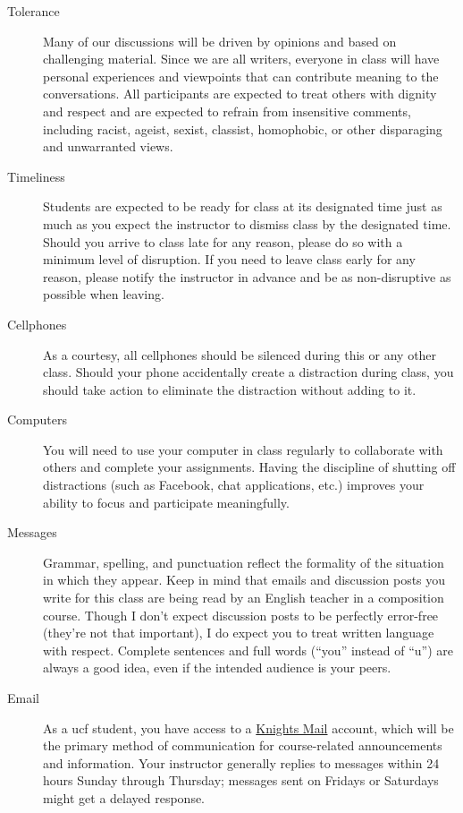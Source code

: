 \documentclass[11pt,oneside]{amsart}	%
\begin{document}
	\begin{description}
	\item[Tolerance] Many of our discussions will be driven by opinions and based on challenging material.  Since we are all writers, everyone in class will have personal experiences and viewpoints that can contribute meaning to the conversations.  All participants are expected to treat others with dignity and respect and are expected to refrain from insensitive comments, including racist, ageist, sexist, classist, homophobic, or other disparaging and unwarranted views.
	\item[Timeliness] Students are expected to be ready for class at its designated time just as much as you expect the instructor to dismiss class by the designated time.  Should you arrive to class late for any reason, please do so with a minimum level of disruption.  If you need to leave class early for any reason, please notify the instructor in advance and be as non-disruptive as possible when leaving.
	\item[Cellphones] As a courtesy, all cellphones should be silenced during this or any other class. Should your phone accidentally create a distraction during class, you should take action to eliminate the distraction without adding to it.
	\item[Computers] You will need to use your computer in class regularly to collaborate with others and complete your assignments. Having the discipline of shutting off distractions (such as Facebook, chat applications, etc.) improves your ability to focus and participate meaningfully.
	\item[Messages] Grammar, spelling, and punctuation reflect the formality of the situation in which they appear.  Keep in mind that emails and discussion posts you write for this class are being read by an English teacher in a composition course.  Though I don't expect discussion posts to be perfectly error-free (they're not that important), I do expect you to treat written language with respect. Complete sentences and full words (``you'' instead of ``u'') are always a good idea, even if the intended audience is your peers.
	\item[Email] As a \ac{ucf} student, you have access to a \href{http://www.outlook.com/knights.ucf.edu}{Knights Mail} account, which will be the primary method of communication for course-related announcements and information. Your instructor generally replies to messages within 24 hours Sunday through Thursday; messages sent on Fridays or Saturdays might get a delayed response.
	\end{description}
	
\end{document}
